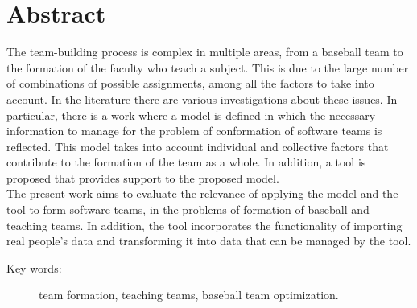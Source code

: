 
\section*{Abstract} 

The team-building process is complex in multiple areas, from a baseball team to the formation of the faculty who teach a subject. This is due to the large number of combinations of possible assignments, among all the factors to take into account. In the literature there are various investigations about these issues. In particular, there is a work where a model is defined in which the necessary information to manage for the problem of conformation of software teams is reflected. This model takes into account individual and collective factors that contribute to the formation of the team as a whole. In addition, a tool is proposed that provides support to the proposed model. \\

The present work aims to evaluate the relevance of applying the model and the tool to form software teams, in the problems of formation of baseball and teaching teams. In addition, the tool incorporates the functionality of importing real people's data and transforming it into data that can be managed by the tool.

\begin{description}
	\item[Key words:]{team formation, teaching teams, baseball team  optimization.}
\end{description}